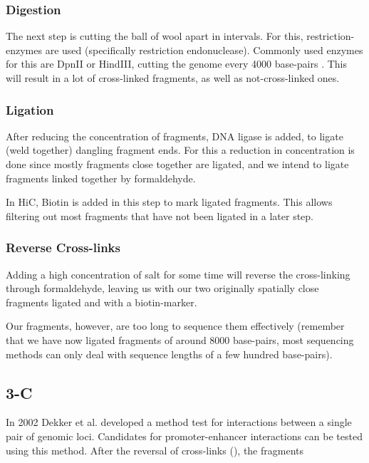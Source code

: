 \subsubsection{Digestion}\label{sec:digestion}

The next step is cutting the ball of wool apart in intervals. For this,
restriction-enzymes are used (specifically restriction endonuclease). Commonly
used enzymes for this are DpnII or HindIII, cutting the genome every 4000
base-pairs \cite{liebermann2009comprehensive}. This will result in a lot of
cross-linked fragments, as well as not-cross-linked ones.

\subsubsection{Ligation}\label{sec:ligation}

After reducing the concentration of fragments, DNA ligase is added, to ligate
(weld together) dangling fragment ends. For this a reduction in concentration
is done since mostly fragments close together are ligated, and we intend to
ligate fragments linked together by formaldehyde.

In HiC, Biotin is added in this step to mark ligated fragments. This allows
filtering out most fragments that have not been ligated in a later step.


\subsubsection{Reverse Cross-links}\label{sec:revcrosslink}

Adding a high concentration of salt for some time will reverse the
cross-linking through formaldehyde, leaving us with our two originally
spatially close fragments ligated and with a biotin-marker.


Our fragments, however, are too long to sequence them effectively (remember
that we have now ligated fragments of around 8000 base-pairs, most sequencing
methods can only deal with sequence lengths of a few hundred base-pairs).




\subsection{3-C}\label{sec:3C} 

In 2002 Dekker et al. \cite{dekker2002capturing} developed a method test for interactions
between a single pair of genomic loci. Candidates for promoter-enhancer
interactions can be tested using this method.
After the reversal of cross-links (), the fragments



